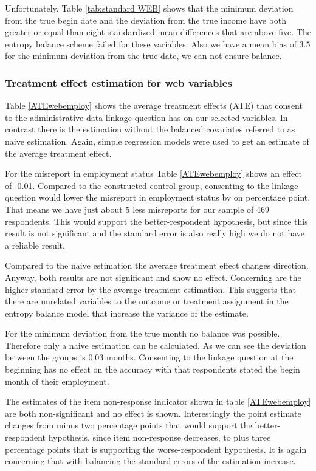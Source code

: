 Unfortunately, Table \ref{tab:standard WEB} shows that the minimum deviation from the true begin date and the deviation from the true income have both greater or equal than eight standardized mean differences that are above five. The entropy balance scheme failed for these variables. Also we have a mean bias of 3.5 for the minimum deviation from the true date, we can not ensure balance. 



\subsubsection{Treatment effect estimation for web variables}
 
Table \ref{ATEwebemploy} shows the average treatment effects (ATE) that consent to the administrative data linkage question has on our selected variables. In contrast there is the estimation without the balanced covariates referred to as naive estimation. Again, simple regression models were used to get an estimate of the average treatment effect. 

For the misreport in employment status Table \ref{ATEwebemploy} shows an effect of -0.01. Compared to the constructed control group, consenting to the linkage question would lower the misreport in employment status by on percentage point. That means we have just about 5 less misreports for our sample of 469 respondents. This would support the better-respondent hypothesis, but since this result is not significant and the standard error is also really high we do not have a reliable result.    

Compared to the naive estimation the average treatment effect changes direction. Anyway, both results are not significant and show no effect. Concerning are the higher standard error by the average treatment estimation. This suggests that there are unrelated variables to the outcome or treatment assignment in the entropy balance model that increase the variance of the estimate. 
 


For the minimum deviation from the true month no balance was possible. Therefore only a naive estimation can be calculated. As we can see the deviation between the groups is 0.03 months. Consenting to the linkage question at the beginning has no effect on the accuracy with that respondents stated the begin month of their employment. 

The estimates of the item non-response indicator shown in table \ref{ATEwebemploy} are both non-significant and no effect is shown. Interestingly the point estimate changes from minus two percentage points that would support the better-respondent hypothesis, since item non-response decreases, to plus three percentage points that is supporting the worse-respondent hypothesis. It is again concerning that with balancing the standard errors of the estimation increase.   

